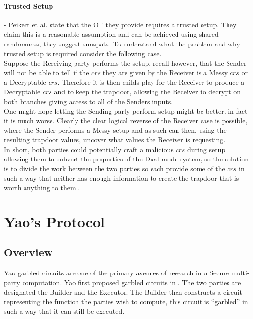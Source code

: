 \documentclass[ %
                    author={Nicholas Tutte},
                supervisor={Prof. Nigel Smart},
                    degree={MEng},
                     title={Secure Two Party Computation},
                  subtitle={A practical comparison of recent protocols},
                      type={Research - GG1K},
                      year={2015} ]{dissertation}
\begin{document}
					\paragraph{Trusted Setup} - Peikert et al. state that the OT they provide requires a trusted setup. They claim this is a reasonable assumption and can be achieved using shared randomness, they suggest sunspots. To understand what the problem and why trusted setup is required consider the following case.\\

					Suppose the Receiving party performs the setup, recall however, that the Sender will not be able to tell if the $crs$ they are given by the Receiver is a Messy $crs$ or a Decryptable $crs$. Therefore it is then childs play for the Receiver to produce a Decryptable $crs$ and to keep the trapdoor, allowing the Receiver to decrypt on both branches giving access to all of the Senders inputs.\\
					
					One might hope letting the Sending party perform setup might be better, in fact it is much worse. Clearly the clear logical reverse of the Receiver case is possible, where the Sender performs a Messy setup and as such can then, using the resulting trapdoor values, uncover what values the Receiver is requesting.\\%

					In short, both parties could potentially craft a malicious $crs$ during setup allowing them to subvert the properties of the Dual-mode system, so the solution is to divide the work between the two parties so each provide some of the $crs$ in such a way that neither has enough information to create the trapdoor that is worth anything to them .


	\section{Yao's Protocol} \label{sec:Yao_Circuits}

		\subsection{Overview} \label{sub:Yao_Overview}
			Yao garbled circuits are one of the primary avenues of research into Secure multi-party computation. Yao first proposed garbled circuits in \cite{YaoOriginal}. The two parties are designated the Builder and the Executor. The Builder then constructs a circuit representing the function the parties wish to compute, this circuit is ``garbled'' in such a way that it can still be executed.\\
\end{document}

